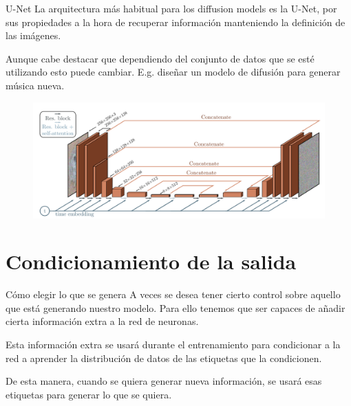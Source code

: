 \begin{frame}{U-Net}
La arquitectura \alert{más habitual} para los diffusion models es la U-Net, por sus propiedades a la hora de recuperar información manteniendo la \alert{definición} de las imágenes.

Aunque cabe destacar que dependiendo del \alert{conjunto de datos} que se esté utilizando esto puede cambiar. E.g. diseñar un modelo de difusión para generar música nueva.

\begin{figure}
    \centering
    \includegraphics[width=\textwidth]{figures/Diffusion_Models/U-Net.png}
    \caption{\cite{U-Net}}
\end{figure}
\end{frame}

\section{Condicionamiento de la salida}

\begin{frame}{Cómo elegir lo que se genera}
A veces se desea tener cierto \alert{control} sobre aquello que está generando nuestro modelo. Para ello tenemos que ser capaces de añadir cierta \alert{información extra} a la red de neuronas.

Esta información extra se usará durante el \alert{entrenamiento} para condicionar a la red a aprender la \alert{distribución de datos} de las etiquetas que la condicionen.

De esta manera, cuando se quiera generar nueva información, se usará esas \alert{etiquetas} para generar lo que se quiera.
\end{frame}


